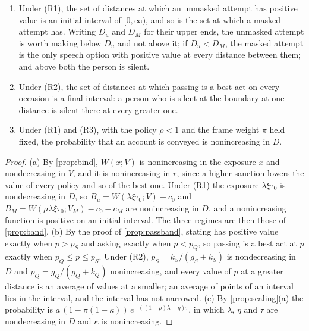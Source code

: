\begin{corollary}\label{cor:distance}
\begin{enumerate}[label=(\alph*)]
\item Under (R1), the set of distances at which an unmasked attempt has positive value is an initial interval of $[0, \infty)$, and so is the set at which a masked attempt has. Writing $D_u$ and $D_M$ for their upper ends, the unmasked attempt is worth making below $D_u$ and not above it; if $D_u < D_M$, the masked attempt is the only speech option with positive value at every distance between them; and above both the person is silent.
\item Under (R2), the set of distances at which passing is a best act on every occasion is a final interval: a person who is silent at the boundary at one distance is silent there at every greater one.
\item Under (R1) and (R3), with the policy $\rho < 1$ and the frame weight $\pi$ held fixed, the probability that an account is conveyed is nonincreasing in $D$.
\end{enumerate}
\end{corollary}

\begin{proof}
(a) By \autoref{prop:bind}, $W(x; V)$ is nonincreasing in the exposure $x$ and nondecreasing in $V$, and it is nonincreasing in $r$, since a higher sanction lowers the value of every policy and so of the best one. Under (R1) the exposure $\lambda\xi\tau_0$ is nondecreasing in $D$, so $B_u = W(\lambda\xi\tau_0; V) - c_0$ and $B_M = W(\mu\lambda\xi\tau_0; V_M) - c_0 - c_M$ are nonincreasing in $D$, and a nonincreasing function is positive on an initial interval. The three regimes are then those of \autoref{prop:band}. (b) By the proof of \autoref{prop:passband}, stating has positive value exactly when $p > p_S$ and asking exactly when $p < p_Q$, so passing is a best act at $p$ exactly when $p_Q \le p \le p_S$. Under (R2), $p_S = k_S/(g_S + k_S)$ is nondecreasing in $D$ and $p_Q = g_Q/(g_Q + k_Q)$ nonincreasing, and every value of $p$ at a greater distance is an average of values at a smaller; an average of points of an interval lies in the interval, and the interval has not narrowed. (c) By \autoref{prop:sealing}(a) the probability is $a\,(1 - \pi(1-\kappa))\,e^{-((1-\rho)\lambda + \eta)\tau}$, in which $\lambda$, $\eta$ and $\tau$ are nondecreasing in $D$ and $\kappa$ is nonincreasing.
\end{proof}

